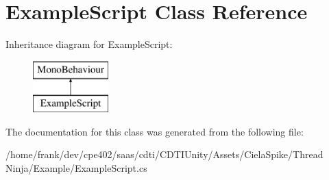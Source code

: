 \hypertarget{class_example_script}{}\section{Example\+Script Class Reference}
\label{class_example_script}
Inheritance diagram for Example\+Script\+:\begin{figure}[H]
\begin{center}
\leavevmode
\includegraphics[height=2.000000cm]{class_example_script}
\end{center}
\end{figure}


The documentation for this class was generated from the following file\+:\begin{DoxyCompactItemize}
\item 
/home/frank/dev/cpe402/saas/cdti/\+C\+D\+T\+I\+Unity/\+Assets/\+Ciela\+Spike/\+Thread Ninja/\+Example/Example\+Script.\+cs\end{DoxyCompactItemize}

